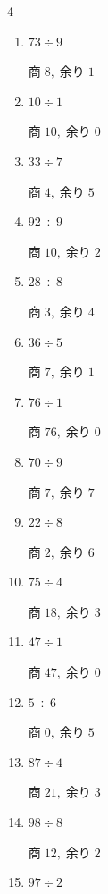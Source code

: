 \begin{multicols}{4}
\begin{enumerate}
        $商\; 20,\; 余り\; 1$

  \item $73 \div 9$

        $商\; 8,\; 余り\; 1$

  \item $10 \div 1$

        $商\; 10,\; 余り\; 0$

  \item $33 \div 7$

        $商\; 4,\; 余り\; 5$

  \item $92 \div 9$

        $商\; 10,\; 余り\; 2$

  \item $28 \div 8$

        $商\; 3,\; 余り\; 4$

  \item $36 \div 5$

        $商\; 7,\; 余り\; 1$

\columnbreak %

  \item $76 \div 1$

        $商\; 76,\; 余り\; 0$

  \item $70 \div 9$

        $商\; 7,\; 余り\; 7$

  \item $22 \div 8$

        $商\; 2,\; 余り\; 6$

  \item $75 \div 4$

        $商\; 18,\; 余り\; 3$

  \item $47 \div 1$

        $商\; 47,\; 余り\; 0$

  \item $5 \div 6$

        $商\; 0,\; 余り\; 5$

  \item $87 \div 4$

        $商\; 21,\; 余り\; 3$

  \item $98 \div 8$

        $商\; 12,\; 余り\; 2$

  \item $97 \div 2$


\end{enumerate}
\end{multicols}
